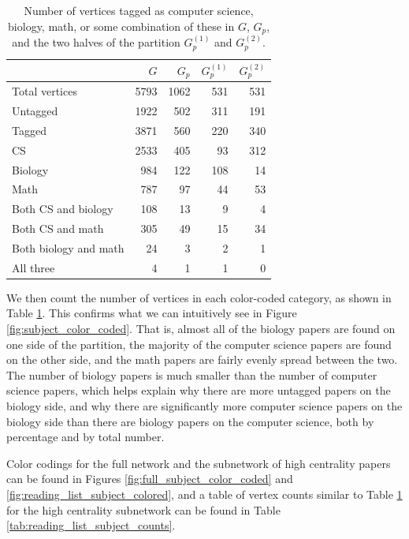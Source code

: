 \documentclass[12pt]{thesis}
\theoremstyle{plain}
\theoremstyle{definition}
\theoremstyle{remark}
\begin{document}
\begin{table}[t]
\centering
\begin{tabular}{|l|r|r|r|r|}
\hline & $G$ & $G_p$ & $G_p^{(1)}$ & $G_p^{(2)}$ \\ \hline
Total vertices & 5793 & 1062 & 531 & 531 \\ \hline
Untagged & 1922 & 502 & 311 & 191 \\ \hline
Tagged & 3871 & 560 & 220 & 340 \\ \hline
CS & 2533 & 405 & 93 & 312 \\ \hline
Biology & 984 & 122 & 108 & 14 \\ \hline
Math & 787 & 97 & 44 & 53 \\ \hline
Both CS and biology & 108 & 13 & 9 & 4 \\ \hline
Both CS and math & 305 & 49 & 15 & 34 \\ \hline
Both biology and math & 24 & 3 & 2 & 1 \\ \hline
All three & 4 & 1 & 1 & 0 \\ \hline
\end{tabular}
\caption{Number of vertices tagged as computer science, biology, math, or some combination of these in $G$, $G_p$, and the two halves of the partition $G_p^{(1)}$ and $G_p^{(2)}$.}
\label{tab:subject_counts}
\end{table}

We then count the number of vertices in each color-coded category, as shown in Table \ref{tab:subject_counts}. This confirms what we can intuitively see in Figure \ref{fig:subject_color_coded}. That is, almost all of the biology papers are found on one side of the partition, the majority of the computer science papers are found on the other side, and the math papers are fairly evenly spread between the two. The number of biology papers is much smaller than the number of computer science papers, which helps explain why there are more untagged papers on the biology side, and why there are significantly more computer science papers on the biology side than there are biology papers on the computer science, both by percentage and by total number.

Color codings for the full network and the subnetwork of high centrality papers can be found in Figures \ref{fig:full_subject_color_coded} and \ref{fig:reading_list_subject_colored}, and a table of vertex counts similar to Table \ref{tab:subject_counts} for the high centrality subnetwork can be found in Table \ref{tab:reading_list_subject_counts}.
\end{document}
